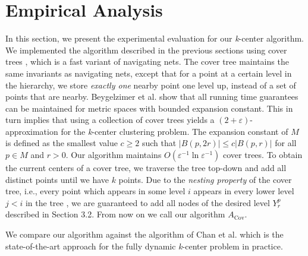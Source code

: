 
\section{Empirical Analysis}
In this section, we present the experimental evaluation for our \textit{k}-center algorithm. We implemented the algorithm described in the previous sections using cover trees \cite{beygelzimer2006cover, kollar2006fast}, which is a fast variant of navigating nets. The cover tree maintains the same invariants as navigating nets, except that for a point at a certain level in the hierarchy, we store \textit{exactly one} nearby point one level up, instead of a set of points that are nearby. Beygelzimer et al. \cite{beygelzimer2006cover} show that all running time guarantees can be maintained for metric spaces with bounded expansion constant. This in turn implies that using a collection of cover trees yields a $(2 + \varepsilon)$-approximation for the \textit{k}-center clustering problem. The expansion constant of $M$ is defined as the smallest value $c \geq 2$ such that $\left| B(p, 2r) \right| \leq c \left| B(p, r) \right|$ for all $p \in M$ and $r > 0$. Our algorithm maintains $O(\varepsilon^{-1} \ln \varepsilon^{-1})$ cover trees. To obtain the current centers of a cover tree, we traverse the tree top-down and add all distinct points until we have $k$ points. Due to the \textit{nesting property} of the cover tree, i.e., every point which appears in some level $i$ appears in every lower level $j < i$ in the tree \cite{beygelzimer2006cover}, we are guaranteed to add all nodes of the desired level $Y^p_r$ described in Section 3.2. From now on we call our algorithm $A_{\text{Cov}}$. 

We compare our algorithm against the algorithm of Chan et al. \cite{hubert2018dynamic} which is the state-of-the-art approach for the fully dynamic \textit{k}-center problem in practice.

